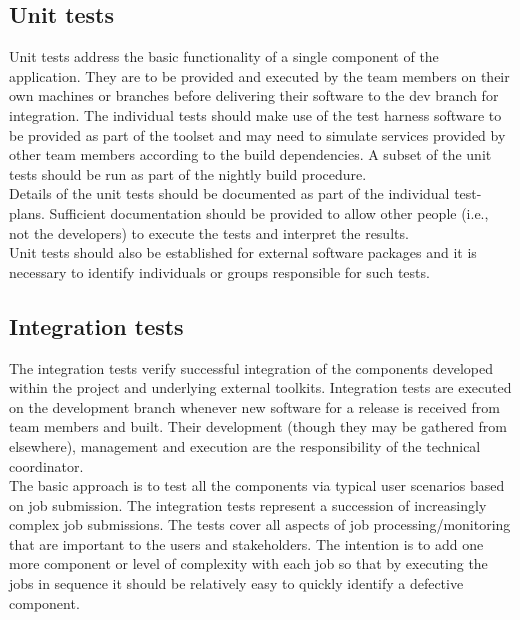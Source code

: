 \subsection{Unit tests}

\noindent Unit tests address the basic functionality of a single component of the application. They are to be provided and executed by the team members on their own machines or branches before delivering their software to the dev branch for integration. The individual tests should make use of the test harness software to be provided as part of the toolset and may need to simulate services provided by other team members according to the build dependencies. A subset of the unit tests should be run as part of the nightly build procedure.\\

\noindent Details of the unit tests should be documented as part of the individual test-plans. Sufficient documentation should be provided to allow other people (i.e., not the developers) to execute the tests and interpret the results.\\

\noindent Unit tests should also be established for external software packages and it is necessary to identify individuals or groups responsible for such tests.

\subsection{Integration tests}

\noindent The integration tests verify successful integration of the components developed within the project and underlying external toolkits. Integration tests are executed on the development branch whenever new software for a release is received from team members and built. Their development (though they may be gathered from elsewhere), management and execution are the responsibility of the technical coordinator.\\

\noindent The basic approach is to test all the components via typical user scenarios based on job submission. The integration tests represent a succession of increasingly complex job submissions. The tests cover all aspects of job processing/monitoring that are important to the users and stakeholders. The intention is to add one more component or level of complexity with each job so that by executing the jobs in sequence it should be relatively easy to quickly identify a defective component.\\

